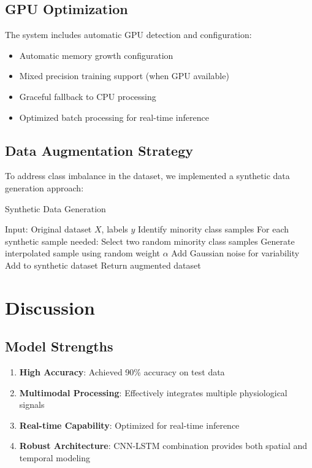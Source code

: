 \documentclass[11pt,a4paper]{article}
\begin{document}
\subsection{GPU Optimization}

The system includes automatic GPU detection and configuration:
\begin{itemize}
    \item Automatic memory growth configuration
    \item Mixed precision training support (when GPU available)
    \item Graceful fallback to CPU processing
    \item Optimized batch processing for real-time inference
\end{itemize}

\subsection{Data Augmentation Strategy}

To address class imbalance in the dataset, we implemented a synthetic data generation approach:

\begin{algorithm}
\caption{Synthetic Data Generation}
\begin{algorithmic}[1]
\STATE Input: Original dataset $X$, labels $y$
\STATE Identify minority class samples
\STATE For each synthetic sample needed:
\STATE \quad Select two random minority class samples
\STATE \quad Generate interpolated sample using random weight $\alpha$
\STATE \quad Add Gaussian noise for variability
\STATE \quad Add to synthetic dataset
\STATE Return augmented dataset
\end{algorithmic}
\end{algorithm}

\section{Discussion}

\subsection{Model Strengths}

\begin{enumerate}
    \item \textbf{High Accuracy}: Achieved 90\% accuracy on test data
    \item \textbf{Multimodal Processing}: Effectively integrates multiple physiological signals
    \item \textbf{Real-time Capability}: Optimized for real-time inference
    \item \textbf{Robust Architecture}: CNN-LSTM combination provides both spatial and temporal modeling
\end{enumerate}
\end{document}
